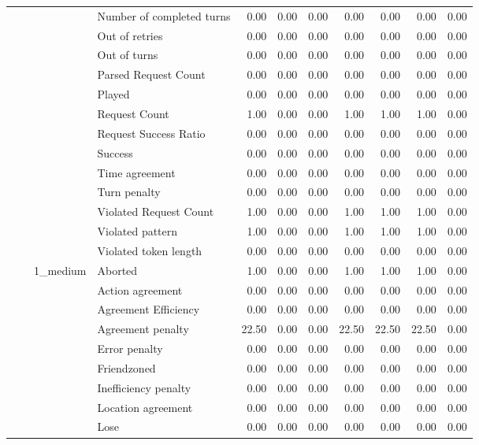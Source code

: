 \begin{tabular}{llllrrrrrrr}
 &  &  & Number of completed turns & 0.00 & 0.00 & 0.00 & 0.00 & 0.00 & 0.00 & 0.00 \\
 &  &  & Out of retries & 0.00 & 0.00 & 0.00 & 0.00 & 0.00 & 0.00 & 0.00 \\
 &  &  & Out of turns & 0.00 & 0.00 & 0.00 & 0.00 & 0.00 & 0.00 & 0.00 \\
 &  &  & Parsed Request Count & 0.00 & 0.00 & 0.00 & 0.00 & 0.00 & 0.00 & 0.00 \\
 &  &  & Played & 0.00 & 0.00 & 0.00 & 0.00 & 0.00 & 0.00 & 0.00 \\
 &  &  & Request Count & 1.00 & 0.00 & 0.00 & 1.00 & 1.00 & 1.00 & 0.00 \\
 &  &  & Request Success Ratio & 0.00 & 0.00 & 0.00 & 0.00 & 0.00 & 0.00 & 0.00 \\
 &  &  & Success & 0.00 & 0.00 & 0.00 & 0.00 & 0.00 & 0.00 & 0.00 \\
 &  &  & Time agreement & 0.00 & 0.00 & 0.00 & 0.00 & 0.00 & 0.00 & 0.00 \\
 &  &  & Turn penalty & 0.00 & 0.00 & 0.00 & 0.00 & 0.00 & 0.00 & 0.00 \\
 &  &  & Violated Request Count & 1.00 & 0.00 & 0.00 & 1.00 & 1.00 & 1.00 & 0.00 \\
 &  &  & Violated pattern & 1.00 & 0.00 & 0.00 & 1.00 & 1.00 & 1.00 & 0.00 \\
 &  &  & Violated token length & 0.00 & 0.00 & 0.00 & 0.00 & 0.00 & 0.00 & 0.00 \\
\cline{3-11}
 &  & \multirow[t]{27}{*}{1_medium} & Aborted & 1.00 & 0.00 & 0.00 & 1.00 & 1.00 & 1.00 & 0.00 \\
 &  &  & Action agreement & 0.00 & 0.00 & 0.00 & 0.00 & 0.00 & 0.00 & 0.00 \\
 &  &  & Agreement Efficiency & 0.00 & 0.00 & 0.00 & 0.00 & 0.00 & 0.00 & 0.00 \\
 &  &  & Agreement penalty & 22.50 & 0.00 & 0.00 & 22.50 & 22.50 & 22.50 & 0.00 \\
 &  &  & Error penalty & 0.00 & 0.00 & 0.00 & 0.00 & 0.00 & 0.00 & 0.00 \\
 &  &  & Friendzoned & 0.00 & 0.00 & 0.00 & 0.00 & 0.00 & 0.00 & 0.00 \\
 &  &  & Inefficiency penalty & 0.00 & 0.00 & 0.00 & 0.00 & 0.00 & 0.00 & 0.00 \\
 &  &  & Location agreement & 0.00 & 0.00 & 0.00 & 0.00 & 0.00 & 0.00 & 0.00 \\
 &  &  & Lose & 0.00 & 0.00 & 0.00 & 0.00 & 0.00 & 0.00 & 0.00 \\

\end{tabular}
